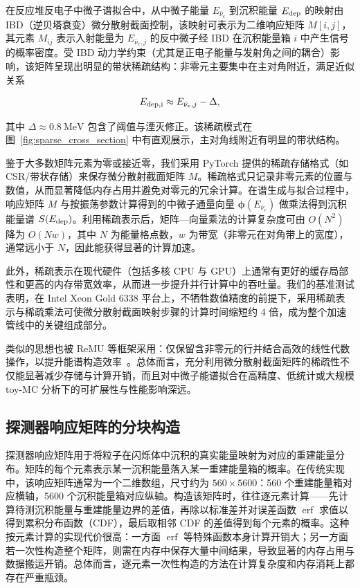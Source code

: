在反应堆反电子中微子谱拟合中，从中微子能量 $E_{\bar{\nu}_e}$ 到沉积能量 $E_{\rm dep}$ 的映射由 IBD（逆贝塔衰变）微分散射截面控制，该映射可表示为二维响应矩阵 $M[i,j]$，其元素 $M_{ij}$ 表示入射能量为 $E_{\bar{\nu}_e,j}$ 的反中微子经 IBD 在沉积能量箱 $i$ 中产生信号的概率密度。受 IBD 动力学约束（尤其是正电子能量与发射角之间的耦合）影响，该矩阵呈现出明显的带状稀疏结构：非零元主要集中在主对角附近，满足近似关系

$$E_{\rm dep,i} \approx E_{\bar{\nu}_e,j} - \Delta,$$

其中 $\Delta\approx 0.8\ \mathrm{MeV}$ 包含了阈值与湮灭修正。该稀疏模式在图~\ref{fig:sparse_cross_section} 中有直观展示，主对角线附近有明显的带状结构。

鉴于大多数矩阵元素为零或接近零，我们采用 PyTorch 提供的稀疏存储格式（如 CSR/带状存储）来保存微分散射截面矩阵 $M$。稀疏格式只记录非零元素的位置与数值，从而显著降低内存占用并避免对零元的冗余计算。在谱生成与拟合过程中，响应矩阵 $M$ 与按振荡参数计算得到的中微子通量向量 $\boldsymbol{\phi}(E_{\bar{\nu}_e})$ 做乘法得到沉积能量谱 $S(E_{\rm dep})$。利用稀疏表示后，矩阵—向量乘法的计算复杂度可由 $O(N^2)$ 降为 $O(Nw)$，其中 $N$ 为能量格点数，$w$ 为带宽（非零元在对角带上的宽度），通常远小于 $N$，因此能获得显著的计算加速。

此外，稀疏表示在现代硬件（包括多核 CPU 与 GPU）上通常有更好的缓存局部性和更高的内存带宽效率，从而进一步提升并行计算中的吞吐量。我们的基准测试表明，在 Intel Xeon Gold 6338 平台上，不牺牲数值精度的前提下，采用稀疏表示与稀疏乘法可使微分散射截面映射步骤的计算时间缩短约 4 倍，成为整个加速管线中的关键组成部分。

类似的思想也被 ReMU 等框架采用：仅保留含非零元的行并结合高效的线性代数操作，以提升能谱构造效率~\cite{Koch2019}。总体而言，充分利用微分散射截面矩阵的稀疏性不仅能显著减少存储与计算开销，而且对中微子能谱拟合在高精度、低统计或大规模 toy-MC 分析下的可扩展性与性能影响深远。

\subsection{探测器响应矩阵的分块构造}
探测器响应矩阵用于将粒子在闪烁体中沉积的真实能量映射为对应的重建能量分布。矩阵的每个元素表示某一沉积能量落入某一重建能量箱的概率。在传统实现中，该响应矩阵通常为一个二维数组，尺寸约为 $560\times5600$：560 个重建能量箱对应横轴，5600 个沉积能量箱对应纵轴。构造该矩阵时，往往逐元素计算——先计算待测沉积能量与重建能量边界的差值，再除以标准差并对误差函数 $\operatorname{erf}$ 求值以得到累积分布函数（CDF），最后取相邻 CDF 的差值得到每个元素的概率。这种按元素计算的实现代价很高：一方面 $\operatorname{erf}$ 等特殊函数本身计算开销大；另一方面若一次性构造整个矩阵，则需在内存中保存大量中间结果，导致显著的内存占用与数据搬运开销。总体而言，逐元素一次性构造的方法在计算复杂度和内存消耗上都存在严重瓶颈。

